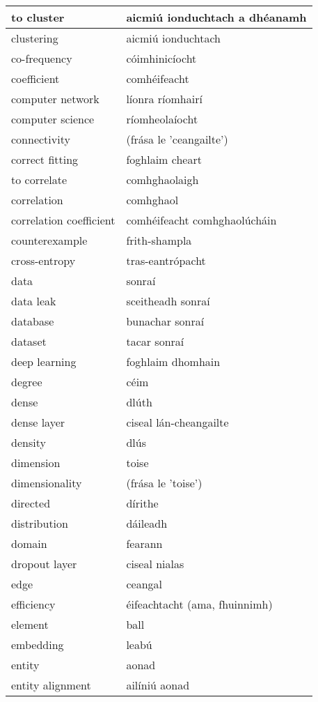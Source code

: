 \begin{longtable}{|l|l|}
		to cluster&aicmiú ionduchtach a dhéanamh\\ \hline 
		clustering&aicmiú ionduchtach\\ \hline 
		co-frequency&cóimhinicíocht\\ \hline 
		coefficient&comhéifeacht\\ \hline 
		computer network&líonra ríomhairí\\ \hline 
		computer science&ríomheolaíocht\\ \hline 
		connectivity&(frása le 'ceangailte')\\ \hline 
		correct fitting&foghlaim cheart\\ \hline 
		to correlate&comhghaolaigh\\ \hline 
		correlation&comhghaol\\ \hline 
		correlation coefficient&comhéifeacht comhghaolúcháin\\ \hline 
		counterexample&frith-shampla\\ \hline 
		cross-entropy&tras-eantrópacht\\ \hline 
		data&sonraí\\ \hline 
		data leak&sceitheadh sonraí\\ \hline 
		database&bunachar sonraí\\ \hline 
		dataset&tacar sonraí\\ \hline 
		deep learning&foghlaim dhomhain\\ \hline 
		degree&céim\\ \hline 
		dense&dlúth\\ \hline 
		dense layer&ciseal lán-cheangailte\\ \hline 
		density&dlús\\ \hline 
		dimension&toise\\ \hline 
		dimensionality&(frása le 'toise')\\ \hline 
		directed&dírithe\\ \hline 
		distribution&dáileadh\\ \hline 
		domain&fearann\\ \hline 
		dropout layer&ciseal nialas\\ \hline 
		edge&ceangal\\ \hline 
		efficiency&éifeachtacht (ama, fhuinnimh)\\ \hline 
		element&ball\\ \hline 
		embedding&leabú\\ \hline 
		entity&aonad\\ \hline 
		entity alignment&ailíniú aonad\\ \hline 

\end{longtable}
